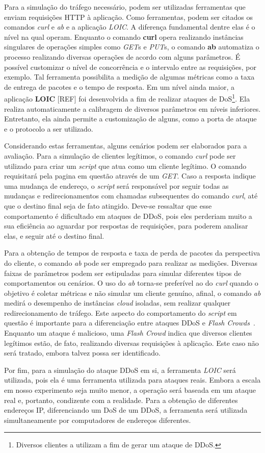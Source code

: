 
Para a simulação do tráfego necessário, podem ser utilizadas ferramentas que enviam requisições HTTP à aplicação. Como ferramentas, podem ser citados os comandos \emph{curl} e \emph{ab} e a aplicação \emph{LOIC}. A diferença fundamental dentre elas é o nível na qual operam. Enquanto o comando \textbf{curl} opera realizando instâncias singulares de operações simples como \emph{GET}s e \emph{PUT}s, o comando \textbf{ab} automatiza o processo realizando diversas operações de acordo com alguns parâmetros. É possível customizar o nível de concorrência e o intervalo entre as requisições, por exemplo. Tal ferramenta possibilita a medição de algumas métricas como a taxa de entrega de pacotes e o tempo de resposta. Em um nível ainda maior, a aplicação \textbf{LOIC} [REF] foi desenvolvida a fim de realizar ataques de DoS\footnote{Diversos clientes a utilizam a fim de gerar um ataque de DDoS.}. Ela realiza automaticamente a calibragem de diversos parâmetros em níveis inferiores. Entretanto, ela ainda permite a customização de alguns, como a porta de ataque e o protocolo a ser utilizado.

Considerando estas ferramentas, alguns cenários podem ser elaborados para a avaliação. 
%
Para a simulação de clientes legítimos, o comando \emph{curl} pode ser utilizado para criar um \emph{script} que atua como um cliente legítimo. O comando requisitará pela pagina em questão através de um \emph{GET}. Caso a resposta indique uma mudança de endereço, o \emph{script} será responsável por seguir todas as mudanças e redirecionamentos com chamadas subsequentes do comando \emph{curl}, até que o destino final seja de fato atingido. Deve-se ressaltar que esse comportamento é dificultado em ataques de DDoS, pois eles perderiam muito a sua eficiência ao aguardar por respostas de requisições, para poderem analisar elas, e seguir até o destino final.

Para a obtenção de tempos de resposta e taxa de perda de pacotes da perspectiva do cliente, o comando \emph{ab} pode ser empregado para realizar as medições. Diversas faixas de parâmetros podem ser estipuladas para simular diferentes tipos de comportamentos ou cenários. O uso do \emph{ab} torna-se preferível ao do \emph{curl} quando o objetivo é coletar métricas e não simular um cliente genuíno, afinal, o comando \emph{ab} medirá o desempenho de instâncias \emph{cloud} isoladas, sem realizar qualquer redirecionamento de tráfego. Este aspecto do comportamento do \emph{script} em questão é importante para a diferenciação entre ataques DDoS e \emph{Flash Crowds}~\cite{Thapngam:2011p27061}. Enquanto um ataque é malicioso, uma \emph{Flash Crowd} indica que diversos clientes legítimos estão, de fato, realizando diversas requisições à aplicação. Este caso não será tratado, embora talvez possa ser identificado.

Por fim, para a simulação do ataque DDoS em si, a ferramenta \emph{LOIC} será utilizada, pois ela é uma ferramenta utilizada para ataques reais. Embora a escala em nosso experimento seja muito menor, a operação será baseada em um ataque real e, portanto, condizente com a realidade. Para a obtenção de diferentes endereços IP, diferenciando um DoS de um DDoS, a ferramenta será utilizada simultaneamente por computadores de endereços diferentes.
